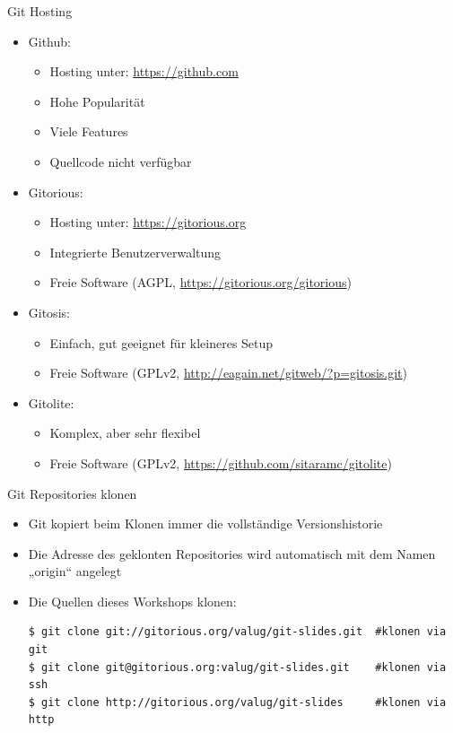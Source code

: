 \begin{frame}[allowframebreaks]{Git Hosting}
  \begin{itemize}
    \item Github:
    \begin{itemize}
      \item Hosting unter: \url{https://github.com}
      \item Hohe Popularität
      \item Viele Features
      \item Quellcode nicht verfügbar
    \end{itemize}
    \item Gitorious:
    \begin{itemize}
      \item Hosting unter: \url{https://gitorious.org}
      \item Integrierte Benutzerverwaltung
      \item Freie Software (AGPL, \url{https://gitorious.org/gitorious})
    \end{itemize}
  \framebreak
    \item Gitosis:
    \begin{itemize}
      \item Einfach, gut geeignet für kleineres Setup
      \item Freie Software (GPLv2, \url{http://eagain.net/gitweb/?p=gitosis.git})
    \end{itemize}
    \item Gitolite:
    \begin{itemize}
      \item Komplex, aber sehr flexibel
      \item Freie Software (GPLv2, \url{https://github.com/sitaramc/gitolite})
    \end{itemize}
  \end{itemize}
\end{frame}

\begin{frame}[fragile]{Git Repositories klonen}
  \begin{itemize}
    \item Git kopiert beim Klonen immer die vollständige Versionshistorie
    \item Die Adresse des geklonten Repositories wird automatisch mit dem Namen „origin“ angelegt
    \item Die Quellen dieses Workshops klonen:
    \begin{lstlisting}
$ git clone git://gitorious.org/valug/git-slides.git  #klonen via git
$ git clone git@gitorious.org:valug/git-slides.git    #klonen via ssh
$ git clone http://gitorious.org/valug/git-slides     #klonen via http
    \end{lstlisting}
  \end{itemize}
\end{frame}


